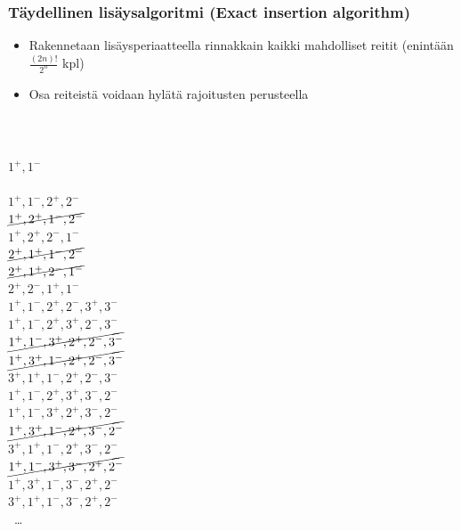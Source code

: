 \documentclass{beamer}
\begin{document}
    
    
    \begin{frame}
\frametitle{Täydellinen lisäysalgoritmi (Exact insertion algorithm)}
 \begin{itemize}
 \item
Rakennetaan lisäysperiaatteella rinnakkain kaikki mahdolliset reitit (enintään $\frac{(2n)!}{2^n}$ kpl)
\item
Osa reiteistä voidaan hylätä rajoitusten perusteella
\end{itemize}
\hfill \\
  \begin{columns}[c]
  \column{0.7in}
  \column{2.5in}  %
 $1^+,1^-$ \\
 \hfill \\
  $1^+,1^-,2^+,2^-$ \\
    $\cancel{1^+,2^+,1^-,2^-}$ \\
     $1^+,2^+,2^-,1^-$ \\
      $\cancel{2^+,1^+,1^-,2^-}$ \\
      $\cancel{2^+,1^+,2^-,1^-}$ \\
      $2^+,2^-,1^+,1^-$ \\
      \column{2.5in}
      {\tiny 
        $1^+,1^-,2^+,2^-,3^+,3^-$ \\
        $1^+,1^-,2^+,3^+,2^-,3^-$ \\
        $\cancel{1^+,1^-,3^+,2^+,2^-,3^-}$ \\
        $\cancel{1^+,3^+,1^-,2^+,2^-,3^-}$ \\
        $3^+,1^+,1^-,2^+,2^-,3^-$ \\
        
        $1^+,1^-,2^+,3^+,3^-,2^-$ \\
        $1^+,1^-,3^+,2^+,3^-,2^-$ \\
        $\cancel{1^+,3^+,1^-,2^+,3^-,2^-}$ \\
        $3^+,1^+,1^-,2^+,3^-,2^-$ \\
        
        $\cancel{1^+,1^-,3^+,3^-,2^+,2^-}$ \\
        $1^+,3^+,1^-,3^-,2^+,2^-$ \\
        $3^+,1^+,1^-,3^-,2^+,2^-$ \\
        \
      \ldots
      }
      \end{columns}
\end{frame}    
    
\end{document}
